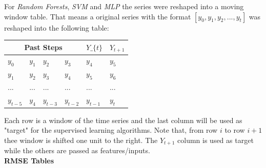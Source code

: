 \documentclass[10pt,twocolumn,letterpaper]{article}
\begin{document}
	For \textit{Random Forests}, \textit{SVM} and \textit{MLP} the series were reshaped into a moving window table. That means a original series with the format $[y_{0},y_{1},y_{2},...,y_{t}]$ was reshaped into the following table:
	
	\begin{table}[h]
		\centering
		\begin{tabular}{|llll|l|l|}
			\hline
			\multicolumn{4}{|c|}{Past Steps}                                                                            &  $Y\_\{t\}$ & $Y_{t+1}$ \\ \hline
			\multicolumn{1}{|l|}{$y_{0}$}   & \multicolumn{1}{l|}{$y_{1}$} & \multicolumn{1}{l|}{$y_{2}$}   & $y_{3}$   & $y_{4}$                & $y_{5}$                \\ \hline
			\multicolumn{1}{|l|}{$y_{1}$}   & \multicolumn{1}{l|}{$y_{2}$} & \multicolumn{1}{l|}{$y_{3}$}   & $y_{4}$   & $y_{5}$                & $y_{6}$                \\ \hline
			\multicolumn{1}{|l|}{...}       & \multicolumn{1}{l|}{...}     & \multicolumn{1}{l|}{...}       & ...       & ...                    & ...                    \\ \hline
			\multicolumn{1}{|l|}{$y_{t-5}$} & \multicolumn{1}{l|}{$y_{4}$} & \multicolumn{1}{l|}{$y_{t-3}$} & $y_{t-2}$ & $y_{t-1}$              & $y_{t}$                \\ \hline
		\end{tabular}
	\end{table}
	
	Each row is a window of the time series and the last column will be used as "target" for the supervised learning algorithms. Note that, from row $i$ to row $i+1$ thee window is shifted one unit to the right. The $Y_{t+1}$ column is used as target while the others are passed as features/inputs.\\
	
	\newpage
	\textbf{RMSE Tables}
	
\end{document}
